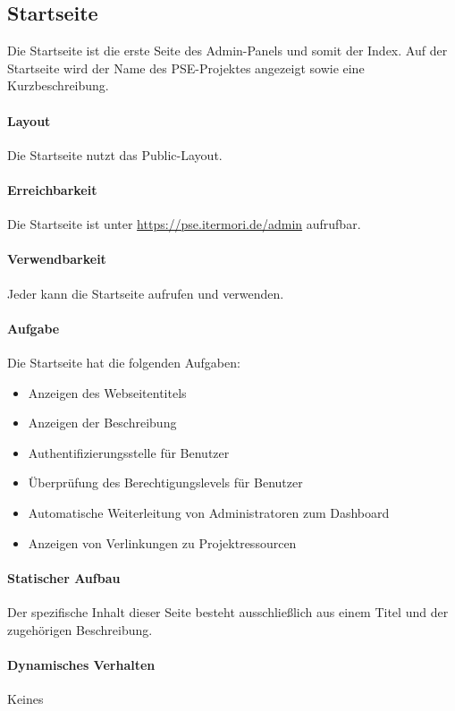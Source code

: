 \subsection{Startseite}

Die Startseite ist die erste Seite des Admin-Panels und somit der Index.
Auf der Startseite wird der Name des PSE-Projektes angezeigt sowie eine Kurzbeschreibung.

\paragraph{Layout}
Die Startseite nutzt das Public-Layout.

\paragraph*{Erreichbarkeit}
Die Startseite ist unter \href{https://pse.itermori.de/admin}{https://pse.itermori.de/admin} aufrufbar.

\paragraph*{Verwendbarkeit}
Jeder kann die Startseite aufrufen und verwenden.

\paragraph{Aufgabe}
Die Startseite hat die folgenden Aufgaben:

\begin{itemize}
    \item Anzeigen des Webseitentitels
    \item Anzeigen der Beschreibung
    \item Authentifizierungsstelle für Benutzer
    \item Überprüfung des Berechtigungslevels für Benutzer
    \item Automatische Weiterleitung von Administratoren zum Dashboard
    \item Anzeigen von Verlinkungen zu Projektressourcen
\end{itemize}

\paragraph*{Statischer Aufbau}
Der spezifische Inhalt dieser Seite besteht ausschließlich aus einem Titel und der zugehörigen Beschreibung.

\paragraph*{Dynamisches Verhalten}
Keines